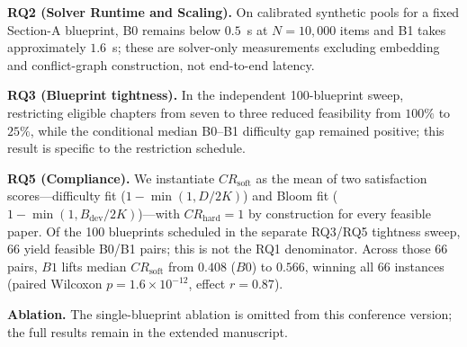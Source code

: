 \documentclass[runningheads]{llncs}
\begin{document}
\noindent\textbf{RQ2 (Solver Runtime and Scaling).} On calibrated synthetic pools for a fixed Section-A blueprint, B0 remains below $0.5$~s at $N=10{,}000$ items and B1 takes approximately $1.6$~s; these are solver-only measurements excluding embedding and conflict-graph construction, not end-to-end latency.

\noindent\textbf{RQ3 (Blueprint tightness).} In the independent 100-blueprint sweep, restricting eligible chapters from seven to three reduced feasibility from $100\%$ to $25\%$, while the conditional median B0--B1 difficulty gap remained positive; this result is specific to the restriction schedule.

\noindent\textbf{RQ5 (Compliance).} We instantiate $CR_{\mathrm{soft}}$ as the mean of two satisfaction scores---difficulty fit ($1-\min(1,D/2K)$) and Bloom fit ($1-\min(1,B_{\mathrm{dev}}/2K)$)---with $CR_{\mathrm{hard}}=1$ by construction for every feasible paper.
Of the 100 blueprints scheduled in the separate RQ3/RQ5 tightness sweep, 66 yield feasible B0/B1 pairs;
this is not the RQ1 denominator. Across those 66 pairs, $B1$ lifts median $CR_{\mathrm{soft}}$ from $0.408$ ($B0$) to $0.566$, winning all 66 instances (paired Wilcoxon $p=1.6{\times}10^{-12}$, effect $r=0.87$).

\noindent\textbf{Ablation.} The single-blueprint ablation is omitted from this conference version; the full results remain in the extended manuscript.
\end{document}
